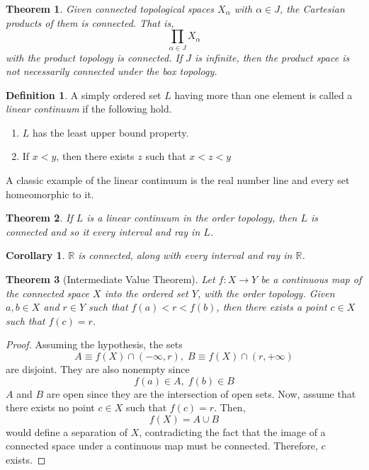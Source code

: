 \documentclass{article}
\newtheorem{theorem}{Theorem}[section]
\newtheorem{corollary}{Corollary}[theorem]
\theoremstyle{remark}
\theoremstyle{definition}
\newtheorem{definition}{Definition}[section]
\begin{document}
\begin{theorem}
Given connected topological spaces $X_\alpha$ with $\alpha \in J$, the Cartesian products of them is connected. That is, 
\[\prod_{\alpha \in J} X_\alpha\]
with the product topology is connected. If $J$ is infinite, then the product space is not necessarily connected under the box topology. 
\end{theorem}

\begin{definition}
A simply ordered set $L$ having more than one element is called a \textit{linear continuum} if the following hold. 
\begin{enumerate}
    \item $L$ has the least upper bound property. 
    \item If $x <y$, then there exists $z$ such that $x<z<y$
\end{enumerate}
A classic example of the linear continuum is the real number line and every set homeomorphic to it. 
\end{definition}

\begin{theorem}
If $L$ is a linear continuum in the order topology, then $L$ is connected and so it every interval and ray in $L$. 
\end{theorem}

\begin{corollary}
$\mathbb{R}$ is connected, along with every interval and ray in $\mathbb{R}$. 
\end{corollary}

\begin{theorem}[Intermediate Value Theorem]
Let $f: X \longrightarrow Y$ be a continuous map of the connected space $X$ into the ordered set $Y$, with the order topology. Given $a, b \in X$ and $r \in Y$ such that $f(a)<r<f(b)$, then there exists a point $c \in X$ such that $f(c) = r$. 
\end{theorem}
\begin{proof}
Assuming the hypothesis, the sets 
\[A \equiv f(X) \cap (-\infty, r), \; B \equiv f(X) \cap (r, +\infty)\]
are disjoint. They are also nonempty since 
\[f(a) \in A, \; f(b) \in B\]
$A$ and $B$ are open since they are the intersection of open sets. Now, assume that there exists no point $c \in X$ such that $f(c) = r$. Then, 
\[f(X) = A \cup B\]
would define a separation of $X$, contradicting the fact that the image of a connected space under a continuous map must be connected. Therefore, $c$ exists. 
\end{proof}
\end{document}
